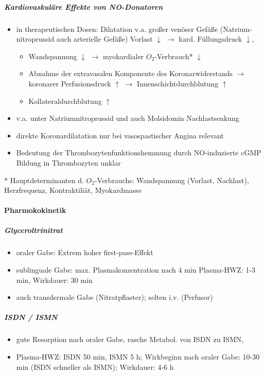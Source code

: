 \documentclass[10pt,a4paper]{report}
\begin{document}
\subparagraph{Kardiovaskuläre Effekte von NO-Donatoren}

\begin{itemize}
	\item in therapeutischen Dosen: Dilatation v.a. großer venöser Gefäße (Natrium-nitroprussid auch arterielle Gefäße)  Vorlast $\downarrow$ $\rightarrow$ kard. Füllungsdruck $\downarrow$,
	\begin{itemize}
		\item Wandspannung $\downarrow$ $\rightarrow$ myokardialer $O_2$-Verbrauch* $\downarrow$
		\item Abnahme der extravasalen Komponente des Koronarwiderstands $\rightarrow$ koronarer Perfusionsdruck $\uparrow$ $\rightarrow$ Innenschichtdurchblutung $\uparrow$
		\item Kollateraldurchblutung $\uparrow$
	\end{itemize}	 
	\item v.a. unter Natriumnitroprussid und auch Molsidomin Nachlastsenkung
	\item direkte Koronardilatation nur bei vasospastischer Angina relevant
	\item Bedeutung der Thrombozytenfunktionshemmung durch NO-induzierte cGMP Bildung in Thrombozyten unklar
\end{itemize}
* Hauptdeterminanten d. $O_2$-Verbrauchs: Wandspannung (Vorlast, Nachlast), Herzfrequenz, Kontraktiliät, Myokardmasse

\paragraph{Pharmokokinetik}

\subparagraph{Glyceroltrinitrat}   
\begin{itemize}
	\item oraler Gabe: 	Extrem hoher first-pass-Effekt
	\item sublinguale Gabe: max. Plasmakonzentration nach 4 min Plasma-HWZ: 1-3 min, Wirkdauer: 30 min
	\item auch transdermale Gabe (Nitratpflaster); selten i.v. (Perfusor)
\end{itemize}

\subparagraph{ISDN / ISMN}
\begin{itemize}
	\item gute Resorption nach oraler Gabe, rasche Metabol. von ISDN zu ISMN, 
	\item Plasma-HWZ: ISDN 50 min, ISMN 5 h; Wirkbeginn nach oraler Gabe: 10-30 min (ISDN schneller als ISMN);  Wirkdauer: 4-6 h
\end{itemize}
\end{document}
